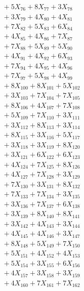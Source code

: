 \documentclass[a4paper,10pt]{article}
\begin{document}
{\begin{align}
&\;  + 5 X_{76} + 8 X_{77} + 3 X_{78} \\[0.3ex]
&\;  + 3 X_{79} + 4 X_{80} + 4 X_{81} \\[0.3ex]
&\;  + 7 X_{82} + 5 X_{83} + 6 X_{84} \\[0.3ex]
&\;  + 4 X_{85} + 4 X_{86} + 7 X_{87} \\[0.3ex]
&\;  + 7 X_{88} + 5 X_{89} + 5 X_{90} \\[0.3ex]
&\;  + 4 X_{91} + 4 X_{92} + 6 X_{93} \\[0.3ex]
&\;  + 7 X_{94} + 4 X_{95} + 4 X_{96} \\[0.3ex]
&\;  + 7 X_{97} + 5 X_{98} + 4 X_{99} \\[0.5ex]\allowbreak
&\;  + 8 X_{100} + 8 X_{101} + 5 X_{102} \\[0.3ex]
&\;  + 3 X_{103} + 7 X_{104} + 7 X_{105} \\[0.3ex]
&\;  + 8 X_{106} + 4 X_{107} + 7 X_{108} \\[0.3ex]
&\;  + 5 X_{109} + 7 X_{110} + 3 X_{111} \\[0.3ex]
&\;  + 3 X_{112} + 8 X_{113} + 3 X_{114} \\[0.3ex]
&\;  + 8 X_{115} + 3 X_{116} + 5 X_{117} \\[0.3ex]
&\;  + 3 X_{118} + 3 X_{119} + 8 X_{120} \\[0.3ex]
&\;  + 3 X_{121} + 6 X_{122} + 6 X_{123} \\[0.3ex]
&\;  + 4 X_{124} + 7 X_{125} + 8 X_{126} \\[0.3ex]
&\;  + 4 X_{127} + 7 X_{128} + 3 X_{129} \\[0.5ex]\allowbreak
&\;  + 7 X_{130} + 3 X_{131} + 8 X_{132} \\[0.3ex]
&\;  + 7 X_{133} + 7 X_{134} + 3 X_{135} \\[0.3ex]
&\;  + 3 X_{136} + 7 X_{137} + 6 X_{138} \\[0.3ex]
&\;  + 3 X_{139} + 8 X_{140} + 8 X_{141} \\[0.3ex]
&\;  + 3 X_{142} + 4 X_{143} + 3 X_{144} \\[0.3ex]
&\;  + 4 X_{145} + 4 X_{146} + 3 X_{147} \\[0.3ex]
&\;  + 8 X_{148} + 5 X_{149} + 7 X_{150} \\[0.3ex]
&\;  + 5 X_{151} + 4 X_{152} + 4 X_{153} \\[0.3ex]
&\;  + 5 X_{154} + 3 X_{155} + 6 X_{156} \\[0.3ex]
&\;  + 4 X_{157} + 3 X_{158} + 3 X_{159} \\[0.5ex]\allowbreak
&\;  + 4 X_{160} + 7 X_{161} + 7 X_{162} \\[0.3ex]

\end{align}}
\end{document}
